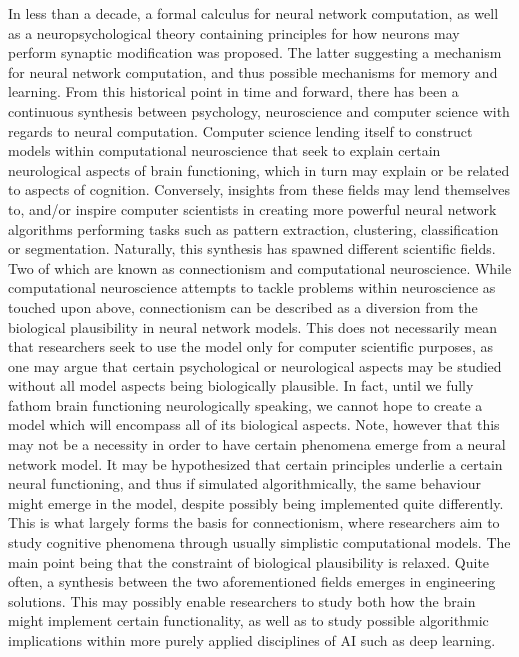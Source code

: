 In less than a decade, a formal calculus for neural network computation, as well as a neuropsychological theory containing principles for how neurons may perform synaptic modification was proposed. The latter suggesting a mechanism for neural network computation, and thus possible mechanisms for memory and learning. From this historical point in time and forward, there has been a continuous synthesis between psychology, neuroscience and computer science with regards to neural computation. Computer science lending itself to construct models within computational neuroscience that seek to explain certain neurological aspects of brain functioning, which in turn may explain or be related to aspects of cognition. Conversely, insights from these fields may lend themselves to, and/or inspire computer scientists in creating more powerful neural network algorithms performing tasks such as pattern extraction, clustering, classification or segmentation. 
Naturally, this synthesis has spawned different scientific fields. Two of which are known as connectionism and computational neuroscience. While computational neuroscience attempts to tackle problems within neuroscience as touched upon above, connectionism can be described as a diversion from the biological plausibility in neural network models. This does not necessarily mean that researchers seek to use the model only for computer scientific purposes, as one may argue that certain psychological or neurological aspects may be studied without all model aspects being biologically plausible. In fact, until we fully fathom brain functioning neurologically speaking, we cannot hope to create a model which will encompass all of its biological aspects. Note, however that this may not be a necessity in order to have certain phenomena emerge from a neural network model. It may be hypothesized that certain principles underlie a certain neural functioning, and thus if simulated algorithmically, the same behaviour might emerge in the model, despite possibly being implemented quite differently. This is what largely forms the basis for connectionism, where researchers aim to study cognitive phenomena through usually simplistic computational models. The main point being that the constraint of biological plausibility is relaxed.
Quite often, a synthesis between the two aforementioned fields emerges in engineering solutions. This may possibly enable researchers to study both how the brain might implement certain functionality, as well as to study possible algorithmic implications within more purely applied disciplines of AI such as deep learning.
\\

